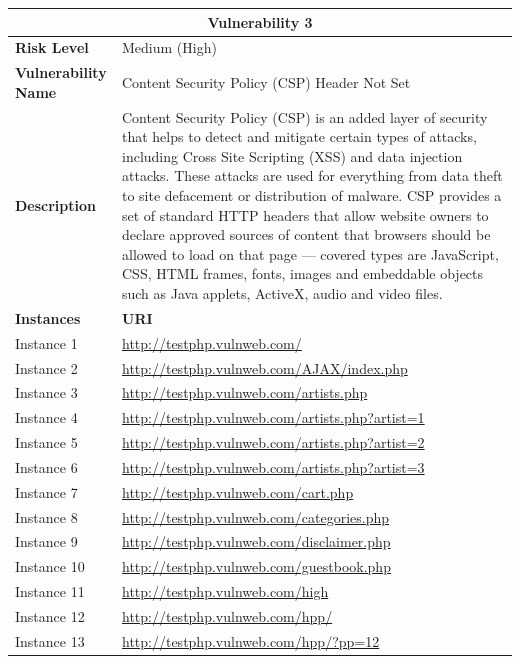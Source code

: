 \documentclass[12pt]{article}
\begin{document}
\begin{center}
\renewcommand{\arraystretch}{1.3}
\begin{longtable}{|l|p{10cm}|}
\hline
\multicolumn{2}{|c|}{\textbf{Vulnerability 3}} \\
\hline
\textbf{Risk Level} & Medium (High) \\
\hline
\textbf{Vulnerability Name} & Content Security Policy (CSP) Header Not Set \\
\hline
\textbf{Description} & Content Security Policy (CSP) is an added layer of security that helps to detect and mitigate certain types of attacks, including Cross Site Scripting (XSS) and data injection attacks. These attacks are used for everything from data theft to site defacement or distribution of malware. CSP provides a set of standard HTTP headers that allow website owners to declare approved sources of content that browsers should be allowed to load on that page --- covered types are JavaScript, CSS, HTML frames, fonts, images and embeddable objects such as Java applets, ActiveX, audio and video files. \\
\hline
\textbf{Instances} & \textbf{URI} \\
\hline
Instance 1 & \url{http://testphp.vulnweb.com/} \\
\hline
Instance 2 & \url{http://testphp.vulnweb.com/AJAX/index.php} \\
\hline
Instance 3 & \url{http://testphp.vulnweb.com/artists.php} \\
\hline
Instance 4 & \url{http://testphp.vulnweb.com/artists.php?artist=1} \\
\hline
Instance 5 & \url{http://testphp.vulnweb.com/artists.php?artist=2} \\
\hline
Instance 6 & \url{http://testphp.vulnweb.com/artists.php?artist=3} \\
\hline
Instance 7 & \url{http://testphp.vulnweb.com/cart.php} \\
\hline
Instance 8 & \url{http://testphp.vulnweb.com/categories.php} \\
\hline
Instance 9 & \url{http://testphp.vulnweb.com/disclaimer.php} \\
\hline
Instance 10 & \url{http://testphp.vulnweb.com/guestbook.php} \\
\hline
Instance 11 & \url{http://testphp.vulnweb.com/high} \\
\hline
Instance 12 & \url{http://testphp.vulnweb.com/hpp/} \\
\hline
Instance 13 & \url{http://testphp.vulnweb.com/hpp/?pp=12} \\

\end{longtable}
\end{center}
\end{document}
